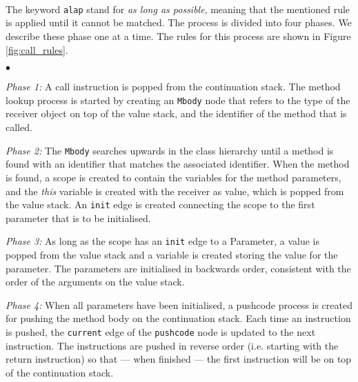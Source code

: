 \begin{figure*}
\centering

\qquad
{}\\
\qquad
{}\\
\qquad
{}\qquad
{}\\
\caption{The rules for the {\sc call} instruction.}
\label{fig:call_rules}
\end{figure*}

The keyword {\tt alap} stand for \emph{as long as possible}, meaning that the mentioned rule is applied until it cannot be matched. The process is divided into four phases. We describe these phase one at a time. The rules for this process are shown in Figure \ref{fig:call_rules}.
\begin{list}{$\bullet$}{}
\item \emph{Phase 1:} A {\sc call} instruction is popped from the continuation stack. The method lookup process is started by creating an {\tt Mbody} node that refers to the type of the receiver object on top of the value stack, and the identifier of the method that is called.
\item \emph{Phase 2:} The {\tt Mbody} searches upwards in the class hierarchy until a method is found with an identifier that matches the associated identifier. When the method is found, a scope is created to contain the variables for the method parameters, and the \emph{this} variable is created with the receiver as value, which is popped from the value stack. An {\tt init} edge is created connecting the scope to the first parameter that is to be initialised.
\item \emph{Phase 3:} As long as the scope has an {\tt init} edge to a Parameter, a value is popped from the value stack and a variable is created storing the value for the parameter. The parameters are initialised in backwards order, consistent with the order of the arguments on the value stack.
\item \emph{Phase 4:} When all parameters have been initialised, a pushcode process is created for pushing the method body on the continuation stack. Each time an instruction is pushed, the {\tt current} edge of the {\tt pushcode} node is updated to the next instruction. The instructions are pushed in reverse order (i.e. starting with the {\sc return} instruction) so that --- when finished --- the first instruction will be on top of the continuation stack.
\end{list}

